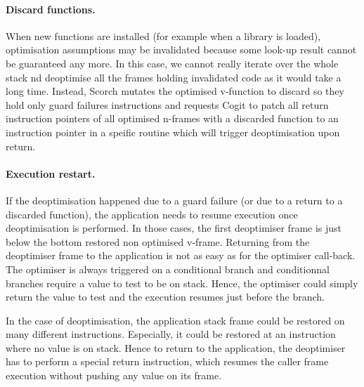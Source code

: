 \documentclass[a4paper,12pt,twoside]{../includes/ThesisStyle}
\begin{document}
\paragraph{Discard functions.} When new functions are installed (for example when a library is loaded), optimisation assumptions may be invalidated because some look-up result cannot be guaranteed any more. In this case, we cannot really iterate over the whole stack nd deoptimise all the frames holding invalidated code as it would take a long time. Instead, Scorch mutates the optimised v-function to discard so they hold only guard failures instructions and requests Cogit to patch all return instruction pointers of all optimised n-frames with a discarded function to an instruction pointer in a speific routine which will trigger deoptimisation upon return.

\paragraph{Execution restart.}

If the deoptimisation happened due to a guard failure (or due to a return to a discarded function), the application needs to resume execution once deoptimisation is performed. In those cases, the first deoptimiser frame is just below the bottom restored non optimised v-frame. Returning from the deoptimiser frame to the application is not as easy as for the optimiser call-back. The optimiser is always triggered on a conditional branch and conditionnal branches require a value to test to be on stack. Hence, the optimiser could simply return the value to test and the execution resumes just before the branch. 

In the case of deoptimisation, the application stack frame could be restored on many different instructions. Especially, it could be restored at an instruction where no value is on stack. Hence to return to the application, the deoptimiser has to perform a special return instruction, which resumes the caller frame execution without pushing any value on its frame.




\ifx\wholebook\relax\else
    
\end{document}
